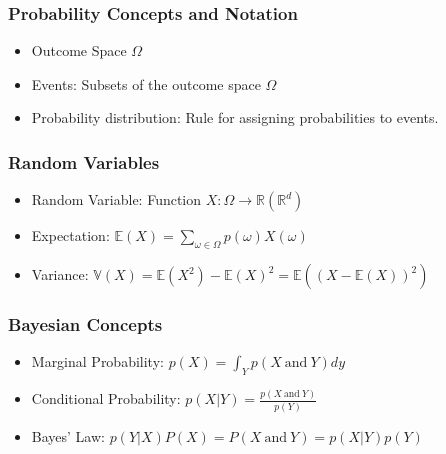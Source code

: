 \documentclass{beamer}
\begin{document}
\begin{frame}
 \frametitle{Probability Concepts and Notation}
 \begin{itemize}
  \item Outcome Space $\Omega$
  \item Events: Subsets of the outcome space $\Omega$
  \item Probability distribution: Rule for assigning probabilities to events.
 \end{itemize}

\end{frame}

\begin{frame}
 \frametitle{Random Variables}
 \begin{itemize}
  \item Random Variable: Function $X:\Omega\rightarrow \mathbb{R} (\mathbb{R}^d)$
  \item Expectation: $\mathbb{E}(X) = \displaystyle\sum_{\omega\in \Omega} p(\omega)X(\omega)$
  \item Variance: $\mathbb{V}(X) = \mathbb{E}(X^2) - \mathbb{E}(X)^2 = \mathbb{E}((X - \mathbb{E}(X))^2)$
 \end{itemize}

\end{frame}

\begin{frame}
 \frametitle{Bayesian Concepts}
 \begin{itemize}
 \item Marginal Probability: $p(X) = \int_Y p(X~\text{and}~Y)dy$
  \item Conditional Probability: $p(X|Y) = \frac{p(X~\text{and}~Y)}{p(Y)}$
  \item Bayes' Law:
  $p(Y|X)P(X) = P(X~\text{and}~Y) = p(X|Y)p(Y)$
 \end{itemize}

\end{frame}
\end{document}
